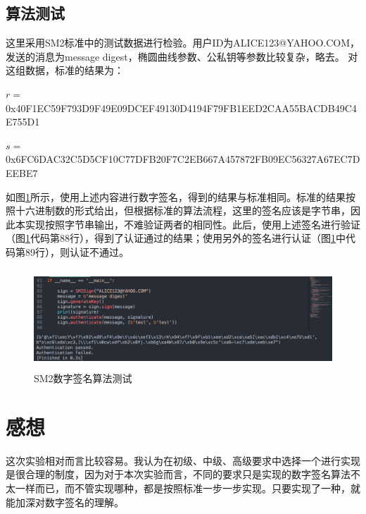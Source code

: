 \documentclass[11pt]{ctexart}
\begin{document}
\subsection{算法测试} %
这里采用SM2标准中的测试数据进行检验。用户ID为ALICE123@YAHOO.COM，发送的消息为message digest，椭圆曲线参数、公私钥等参数比较复杂，略去。
对这组数据，标准的结果为：

$r = $ 0x40F1EC59F793D9F49E09DCEF49130D4194F79FB1EED2CAA55BACDB49C4E755D1

$s = $ 0x6FC6DAC32C5D5CF10C77DFB20F7C2EB667A457872FB09EC56327A67EC7DEEBE7

如图\ref{img_sign}所示，使用上述内容进行数字签名，得到的结果与标准相同。标准的结果按照十六进制数的形式给出，但根据标准的算法流程，这里的签名应该是字节串，因此本实现按照字节串输出，不难验证两者的相同性。此后，使用上述签名进行验证（图\ref{img_sign}代码第88行），得到了认证通过的结果；使用另外的签名进行认证（图\ref{img_sign}中代码第89行），则认证不通过。

\begin{figure}[htbp]
\centering
\includegraphics[width=13.12cm, height=3.73cm]{sign.png}
\caption{SM2数字签名算法测试}
\label{img_sign}
\end{figure}
\section{感想} %
这次实验相对而言比较容易。我认为在初级、中级、高级要求中选择一个进行实现是很合理的制度，因为对于本次实验而言，不同的要求只是实现的数字签名算法不太一样而已，而不管实现哪种，都是按照标准一步一步实现。只要实现了一种，就能加深对数字签名的理解。
\end{document}
